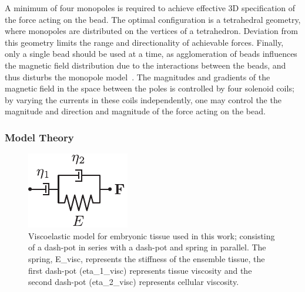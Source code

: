 A minimum of four monopoles is required to achieve effective 3D specification of the force acting on the bead.
The optimal configuration is a tetrahedral geometry, where monopoles are distributed on the vertices of a tetrahedron.
Deviation from this geometry limits the range and directionality of achievable forces.
Finally, only a single bead should be used at a time, as agglomeration of beads influences the magnetic field distribution due to the interactions between the beads, and thus disturbs the monopole model~\cite{Möller et al. 2003}. %
The magnitudes and gradients of the magneticfield in the space between the poles is controlled by four solenoid coils; by varying the currents in these coils independently, one may control the the magnitude and direction and magnitude of the force acting on the bead.

\subsubsection{Model Theory}

\begin{figure}
 \centering
 \includegraphics{Chapters/tweezers/Figs/PDF/viscoelastic_model}
 \caption{
 Viscoelastic model for embryonic tissue used in this work; consisting of a dash-pot in series with a dash-pot and spring in parallel.
 The spring, \gls{E_visc}, represents the stiffness of the ensemble tissue, the first dash-pot (\gls{eta_1_visc}) represents tissue viscosity and the second dash-pot (\gls{eta_2_visc}) represents cellular viscosity.
 \label{fig:viscoelastic_model}
 }
\end{figure}

